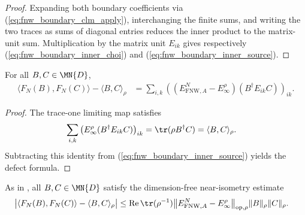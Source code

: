 \begin{proof}
    \leanok
    Expanding both boundary coefficients via
    (\ref{eq:fnw_boundary_clm_apply}), interchanging the finite sums, and
    writing the two traces as sums of diagonal entries reduces the inner
    product to the matrix-unit sum. Multiplication by the matrix unit $E_{ik}$
    gives respectively (\ref{eq:fnw_boundary_inner_choi}) and
    (\ref{eq:fnw_boundary_inner_source}).
\end{proof}

\begin{lemma}
    \label{thm:fnw_boundary_defect}
    \leanok
    For all $B,C\in\MN{D}$,
    \begin{align}
        \langle F_N(B),F_N(C)\rangle-\langle B,C\rangle_\rho
         & =\sum_{i,k}
        \left(\left(E_{\mathrm{FNW},A}^N-E_\infty^\rho\right)
        \left(B^\dagger E_{ik}C\right)\right)_{ik}.
        \label{eq:fnw_boundary_defect}
    \end{align}
\end{lemma}

\begin{proof}
    \leanok
    The trace-one limiting map satisfies
    \begin{align}
        \sum_{i,k}
        \left(E_\infty^\rho(B^\dagger E_{ik}C)\right)_{ik}
         & =\tr(\rho B^\dagger C)=\langle B,C\rangle_\rho.
    \end{align}
    Subtracting this identity from
    (\ref{eq:fnw_boundary_inner_source}) yields the defect formula.
\end{proof}

\begin{lemma}
    \label{thm:fnw_boundary_near_isometry_exact}
    \leanok
    As in \cite[Equation~(5.9)]{Fannes1992Finitely}, all $B,C\in\MN{D}$ satisfy
    the dimension-free near-isometry estimate
    \begin{align}
        \bigl|\langle F_N(B),F_N(C)\rangle
        -\langle B,C\rangle_\rho\bigr|
         & \leq\operatorname{Re}\tr(\rho^{-1})
        \bigl\lVert E_{\mathrm{FNW},A}^N-E_\infty^\rho
        \bigr\rVert_{\mathrm{op},\rho}
        \lVert B\rVert_\rho\lVert C\rVert_\rho.
        \label{eq:fnw_boundary_near_isometry_exact}
    \end{align}
\end{lemma}

